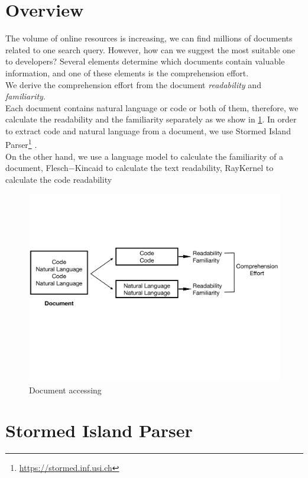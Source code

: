 \documentclass[12pt,mscthesis]{usiinfthesis}
\begin{document}
	
	\section{Overview}
	The volume of online resources is increasing, we can find millions of documents related to one search query. However, how can we suggest the most suitable one to developers? Several elements determine which documents contain valuable information, and one of these elements is the comprehension effort.\\
	We derive the comprehension effort from the document \textit{readability} and \textit{familiarity}.\\

	Each document contains natural language or code or both of them, therefore, we calculate the readability and the familiarity separately as we show in \cref{fig1}. 
	In order to extract code and natural language from a document, we use Stormed Island Parser\footnote{\url{https://stormed.inf.usi.ch}} \cite{Ponz2015a}.\\
	\newpage
	On the other hand, we use a language model to calculate the familiarity of a document, Flesch$-$Kincaid to calculate the text readability, RayKernel \cite{Buse:2010:LMC:1850489.1850615} to calculate the code readability
	

	\begin{figure}[htbp]
	\centering
	\includegraphics[width=\textwidth]{fig1}
	\caption{Document accessing}
	\label{fig1}
	\end{figure}

	\section{Stormed Island Parser}
\end{document}

